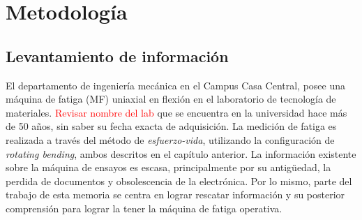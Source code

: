 \chapter{Metodología}
\section{Levantamiento de información}
El departamento de ingeniería mecánica en el Campus Casa Central, posee una máquina de fatiga (MF) uniaxial en flexión en el laboratorio de tecnología de materiales. \textcolor{red}{Revisar nombre del lab} que se encuentra en la universidad hace más de 50 años, sin saber su fecha exacta de adquisición. La medición de fatiga es realizada a través del método de \textit{esfuerzo-vida}, utilizando la configuración de \textit{rotating bending}, ambos descritos en el capítulo anterior. La información existente sobre la máquina de ensayos es escasa, principalmente por su antigüedad, la perdida de documentos y obsolescencia de la electrónica. Por lo mismo, parte del trabajo de esta memoria se centra en lograr rescatar información y su posterior comprensión para lograr la tener la máquina de fatiga operativa.

